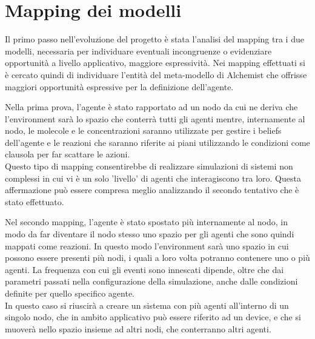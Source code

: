 \documentclass[12pt,a4paper,openright,twoside]{report}
\begin{document}
\section{Mapping dei modelli}
Il primo passo nell'evoluzione del progetto \`e stata l'analisi del mapping tra i due modelli, necessaria per individuare eventuali incongruenze o evidenziare opportunit\`a a livello applicativo, maggiore espressivit\`a.
Nei mapping effettuati si \`e cercato quindi di individuare l'entit\`a del meta-modello di Alchemist che offrisse maggiori opportunit\`a espressive per la definizione dell'agente.

Nella prima prova, l'agente \`e stato rapportato ad un nodo da cui ne deriva che l'environment sar\`a lo spazio che conterr\`a tutti gli agenti mentre, internamente al nodo, le molecole e le concentrazioni saranno utilizzate per gestire i beliefs dell'agente e le reazioni che saranno riferite ai piani utilizzando le condizioni come clausola per far scattare le azioni.
\\Questo tipo di mapping consentirebbe di realizzare simulazioni di sistemi non complessi in cui vi \`e un solo 'livello' di agenti che interagiscono tra loro. Questa affermazione pu\`o essere compresa meglio analizzando il secondo tentativo che \`e stato effettuato.

Nel secondo mapping, l'agente \`e stato spostato pi\`u internamente al nodo, in modo da far diventare il nodo stesso uno spazio per gli agenti che sono quindi mappati come reazioni. In questo modo l'environment sar\`a uno spazio in cui possono essere presenti pi\`u nodi, i quali a loro volta potranno contenere uno o pi\`u agenti. La frequenza con cui gli eventi sono innescati dipende, oltre che dai parametri passati nella configurazione della simulazione, anche dalle condizioni definite per quello specifico agente.
\\In questo caso si riuscir\`a a creare un sistema con pi\`u agenti all'interno di un singolo nodo, che in ambito applicativo pu\`o essere riferito ad un device, e che si muover\`a nello spazio insieme ad altri nodi, che conterranno altri agenti.
\end{document}
